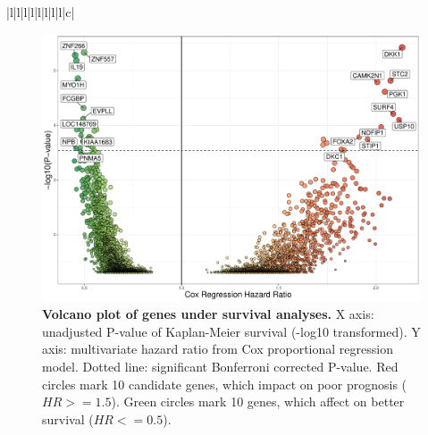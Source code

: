 \documentclass[cancers,article,submit,moreauthors,pdftex]{Definitions/mdpi}
\newcommand{\bcaption}[2]{\caption{\textbf{#1} #2}}
\begin{document}
\begin{table}[hp]
{\begin{tabular}{|l|l|l|l|l|l|l|l|c|}
\hline
{}                                                                                                                                                                                                                 \\
\hline
\end{tabular}
}
\label{table:table3}
\end{table}




\begin{figure}[hp]
\centering
\includegraphics[width=\textwidth]{TCGA_HNSC_Optimal_Overall_allPlot_unKM_P_multiHR-Figure3.pdf} %
\bcaption{Volcano plot of genes under survival analyses.}
{X axis: unadjusted P-value of Kaplan-Meier survival (-log10 transformed).
Y axis: multivariate hazard ratio from Cox proportional regression model.
Dotted line: significant Bonferroni corrected P-value. 
Red circles mark 10 candidate genes, which impact on poor prognosis ($HR>=1.5$). Green circles mark 10 genes, which affect on better survival ($HR<=0.5$).}
\label{fig:figure3}
\end{figure}
\end{document}
